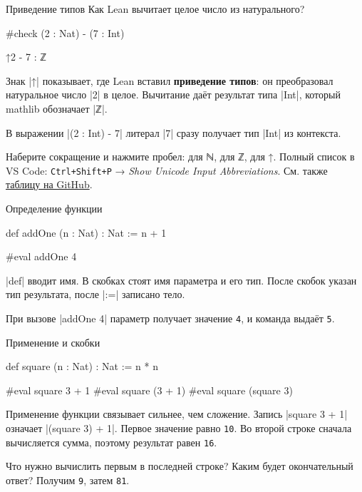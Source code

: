\documentclass[aspectratio=169]{beamer}
\begin{document}
\begin{frame}[fragile]{Приведение типов}
Как Lean вычитает целое число из натурального?
\begin{lean}
#check (2 : Nat) - (7 : Int)
\end{lean}
\pause
\begin{leanoutput}
↑2 - 7 : ℤ
\end{leanoutput}
Знак \leaninline|↑| показывает, где Lean вставил \textbf{приведение типов}: он преобразовал натуральное число \leaninline|2| в целое. Вычитание даёт результат типа \leaninline|Int|, который mathlib обозначает \leaninline|ℤ|.

В выражении \leaninline|(2 : Int) - 7| литерал \leaninline|7| сразу получает тип \leaninline|Int| из контекста.

Наберите сокращение и нажмите пробел:  для ℕ,  для ℤ,  для ↑.
Полный список в VS Code: \texttt{Ctrl+Shift+P} → \textit{Show Unicode Input Abbreviations}. См. также \href{https://github.com/leanprover/vscode-lean4/blob/master/lean4-unicode-input/src/abbreviations.json}{таблицу на GitHub}.
\end{frame}

\begin{frame}[fragile]{Определение функции}
\begin{lean}
def addOne (n : Nat) : Nat :=
  n + 1

#eval addOne 4
\end{lean}
\leaninline|def| вводит имя. В скобках стоят имя параметра и его тип. После скобок указан тип результата, после \leaninline|:=| записано тело.

\pause
При вызове \leaninline|addOne 4| параметр получает значение \texttt{4}, и команда выдаёт \texttt{5}.
\end{frame}

\begin{frame}[fragile]{Применение и скобки}
\begin{lean}
def square (n : Nat) : Nat := n * n

#eval square 3 + 1
#eval square (3 + 1)
#eval square (square 3)
\end{lean}
Применение функции связывает сильнее, чем сложение. Запись \leaninline|square 3 + 1| означает \leaninline|(square 3) + 1|.
\pause
Первое значение равно \texttt{10}.
\pause
Во второй строке сначала вычисляется сумма, поэтому результат равен \texttt{16}.

Что нужно вычислить первым в последней строке? Каким будет окончательный ответ? \pause Получим \texttt{9}, затем \texttt{81}.
\end{frame}
\end{document}
